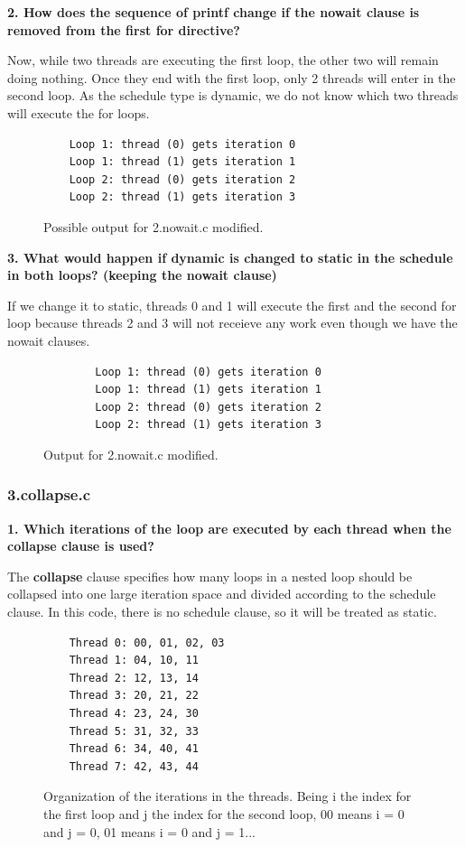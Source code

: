 \documentclass[12pt, a4paper]{article}
\begin{document}
\hfill

\textbf{2. How does the sequence of printf change if the nowait clause is removed from the first for
directive?}

Now, while two threads are executing the first loop, the other two will remain doing nothing. Once they end with the first loop, only 2 threads will enter in the second loop. As the schedule type is dynamic, we do not know which two threads will execute the for loops.

\begin{figure}[H]
	\begin{lstlisting}
	Loop 1: thread (0) gets iteration 0
	Loop 1: thread (1) gets iteration 1
	Loop 2: thread (0) gets iteration 2
	Loop 2: thread (1) gets iteration 3
	\end{lstlisting}
	\caption{Possible output for 2.nowait.c modified.}
\end{figure}

\hfill

\textbf{3. What would happen if dynamic is changed to static in the schedule in both loops? (keeping
the nowait clause)}

If we change it to static, threads 0 and 1 will execute the first and the second for loop because threads 2 and 3 will not receieve any work even though we have the nowait clauses.

\begin{figure}[H]
	\begin{lstlisting}
		Loop 1: thread (0) gets iteration 0
		Loop 1: thread (1) gets iteration 1
		Loop 2: thread (0) gets iteration 2
		Loop 2: thread (1) gets iteration 3
	\end{lstlisting}
	\caption{Output for 2.nowait.c modified.}
\end{figure}

\subsubsection{3.collapse.c}

\textbf{1. Which iterations of the loop are executed by each thread when the collapse clause is used?}

The \textbf{collapse} clause specifies how many loops in a nested loop should be collapsed into one large iteration space and divided according to the schedule clause. In this code, there is no schedule clause, so it will be treated as static.

\begin{figure}[H]
	\begin{lstlisting}
	Thread 0: 00, 01, 02, 03
	Thread 1: 04, 10, 11
	Thread 2: 12, 13, 14
	Thread 3: 20, 21, 22
	Thread 4: 23, 24, 30
	Thread 5: 31, 32, 33
	Thread 6: 34, 40, 41
	Thread 7: 42, 43, 44
	\end{lstlisting}
	\caption{Organization of the iterations in the threads. Being i the index for the first loop and j the index for the second loop, 00 means i = 0 and j = 0, 01 means i = 0 and j = 1...}
\end{figure}
\end{document}
